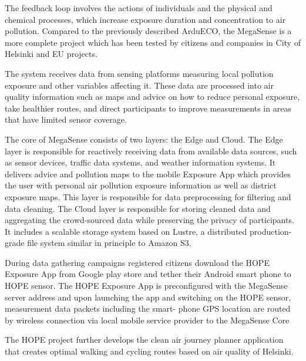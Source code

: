 			\begin{minipage}{0.65\textwidth}\raggedright
				The feedback loop involves the actions of individuals and the physical and chemical processes, which increase exposure duration and concentration to air pollution. 
				Compared to the previously described ArduECO, the MegaSense is a more complete project which has been tested by citizens and companies in City of Helsinki and EU projects.
				
				The system receives data from sensing platforms
				measuring local pollution exposure and other variables affecting it. These data are processed into air quality information such
				as maps and advice on how to reduce personal exposure, take
				healthier routes, and direct participants to improve measurements in areas that have limited sensor coverage.
			\end{minipage}
		
			The core of MegaSense consists of two layers: the Edge and
			Cloud. The Edge layer is responsible for reactively receiving
			data from available data sources, such as sensor devices,
			traffic data systems, and weather information systems. It
			delivers advice and pollution maps to the mobile Exposure App
			which provides the user with personal air pollution exposure
			information as well as district exposure maps.
			This layer is responsible for data preprocessing for filtering
			and data cleaning.
			The Cloud layer is responsible for storing cleaned data
			and aggregating the crowd-sourced data while preserving the
			privacy of participants. It includes a scalable storage system
			based on Lustre, a distributed production-grade file system
			similar in principle to Amazon S3.
			
			During data gathering campaigns registered citizens download the HOPE Exposure App from Google play store and
			tether their Android smart phone to HOPE sensor. The HOPE
			Exposure App is preconfigured with the MegaSense server
			address and upon launching the app and switching on the
			HOPE sensor, measurement data packets including the smart-
			phone GPS location are routed by wireless connection via local
			mobile service provider to the MegaSense Core
			
			The HOPE project further develops the clean air journey
			planner application that creates optimal walking and cycling
			routes based on air quality of Helsinki.
